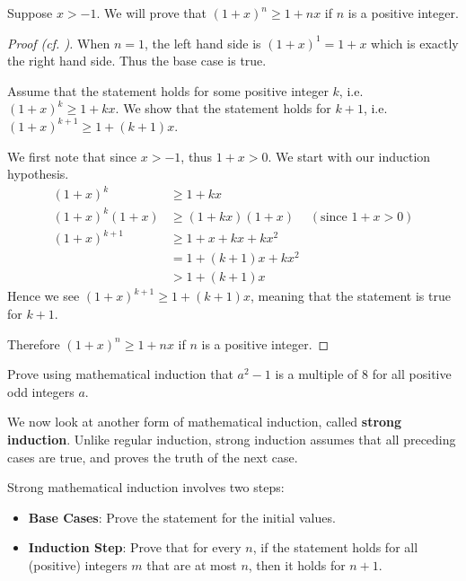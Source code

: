 \begin{example}
    Suppose $x > -1$. We will prove that $(1+x)^n \geq 1+nx$ if $n$ is a positive integer.
    \begin{proof}[Proof (cf. {\cite[p.~186]{hammack_2018}})]
        When $n = 1$, the left hand side is $(1+x)^1 = 1+x$ which is exactly the right hand side. Thus the base case is true.

        Assume that the statement holds for some positive integer $k$, i.e. $(1+x)^k \geq 1+kx$. We show that the statement holds for $k+1$, i.e. $(1+x)^{k+1} \geq 1+(k+1)x$.

        We first note that since $x>-1$, thus $1+x > 0$. We start with our induction hypothesis.
        \begin{align*}
            (1+x)^k &\geq 1+kx\\
            (1+x)^k(1+x) &\geq (1+kx)(1+x) & (\text{since }1+x > 0)\\
            (1+x)^{k+1} &\geq 1 + x + kx + kx^2\\
            &= 1+(k+1)x + kx^2\\
            &> 1+(k+1)x
        \end{align*}
        Hence we see $(1+x)^{k+1} \geq 1+(k+1)x$, meaning that the statement is true for $k+1$.

        Therefore $(1+x)^n \geq 1+nx$ if $n$ is a positive integer.
    \end{proof}
\end{example}

\begin{exercise}
    Prove using mathematical induction that $a^2 - 1$ is a multiple of 8 for all positive odd integers $a$.
\end{exercise}

We now look at another form of mathematical induction, called \textbf{strong induction}. Unlike regular induction, strong induction assumes that all preceding cases are true, and proves the truth of the next case.

Strong mathematical induction involves two steps:
\begin{itemize}
    \item \textbf{Base Cases}: Prove the statement for the initial values.
    \item \textbf{Induction Step}: Prove that for every $n$, if the statement holds for all (positive) integers $m$ that are at most $n$, then it holds for $n + 1$.
\end{itemize}

